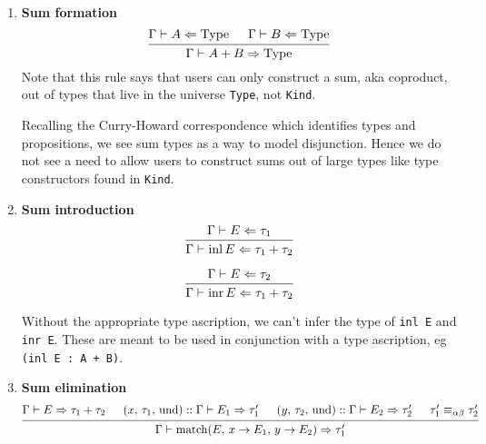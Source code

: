 \documentclass{article}
\begin{document}
\begin{enumerate}
  \item \textbf{Sum formation} \\
  \[
    \begin{prooftree}
      \hypo{\Gamma \vdash A \Leftarrow \Type} 
      \hypo{\Gamma \vdash B \Leftarrow \Type} 
      \infer2{\Gamma \vdash A + B \Rightarrow \Type} 
    \end{prooftree}
  \]
  Note that this rule says that users can only construct a sum, aka 
  coproduct, out of types that live in the universe \verb|Type|, not 
  \verb|Kind|.

  Recalling the Curry-Howard correspondence which identifies types and
  propositions, we see sum types as a way to model disjunction. Hence we do
  not see a need to allow users to construct sums out of large types like
  type constructors found in \verb|Kind|.


  \item \textbf{Sum introduction} \\
  \[
    \begin{prooftree}
      \hypo{\Gamma \vdash E \Leftarrow \tau_1} 
      \infer1{\Gamma \vdash \inl E \Leftarrow \tau_1 + \tau_2} 
    \end{prooftree}
  \]

  \[
    \begin{prooftree}
    \hypo{\Gamma \vdash E \Leftarrow \tau_2} 
    \infer1{\Gamma \vdash \inr E \Leftarrow \tau_1 + \tau_2} 
    \end{prooftree}
  \]

  Without the appropriate type ascription, we can't infer the type of \verb|inl E|
  and \verb|inr E|. These are meant to be used in conjunction with a type
  ascription, eg \verb|(inl E : A + B)|.
  \item \textbf{Sum elimination} \\
  \[
  \begin{prooftree}
    \hypo{\Gamma \vdash E \Rightarrow \tau_1 + \tau_2}
    \hypo{(x, \, \tau_1, \, \text{und}) :: \Gamma \vdash E_1 \Rightarrow \tau_1'}
    \hypo{(y, \, \tau_2, \, \text{und}) :: \Gamma \vdash E_2 \Rightarrow \tau_2'}
    \hypo{\tau_1' \equiv_{\alpha \beta} \tau_2'}
    \infer4{\Gamma \vdash \match(E, \, x \rightarrow E_1, \, y \rightarrow E_2)
              \Rightarrow \tau_1'}
  \end{prooftree}  
\]


\end{enumerate}
\end{document}
